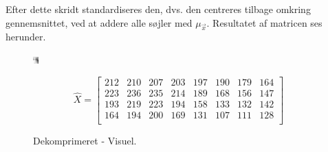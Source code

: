 Efter dette skridt standardiseres den, dvs. den centreres tilbage omkring gennemsnittet, ved at addere alle søjler med $\mu_{\vec{x}}$. Resultatet af matricen ses herunder.

\begin{figure}[!h]
\begin{minipage}[b]{0.27\linewidth}
\centering
\includegraphics[width=\textwidth]{Billeder/LenaAnvendelse/testBillede/testBillede2.png}
\caption{Dekomprimeret - Visuel.}
\label{fig:X_anvendelse-tal-slut}
\end{minipage}
\hspace{0.5cm}
\begin{minipage}[b]{0.45\linewidth}
\centering
\[\hat{X} = \begin{bmatrix}
212 & 210 & 207 & 203 & 197 & 190 & 179 & 164 \\
223 & 236 & 235 & 214 & 189 & 168 & 156 & 147 \\
193 & 219 & 223 & 194 & 158 & 133 & 132 & 142 \\
164 & 194 & 200 & 169 & 131 & 107 & 111 & 128 \\

\end{bmatrix}\]
\end{minipage}
\end{figure}
